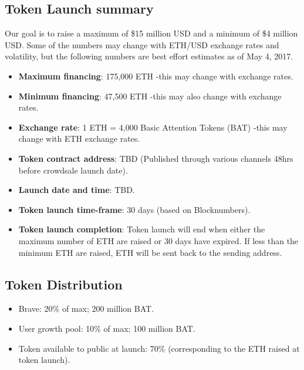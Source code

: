 \documentclass[11pt]{article}
\begin{document}
\subsection{Token Launch summary}
\label{sec-6-1}
{Our goal is to raise a maximum of \$15 million USD and a minimum of \$4 million USD. Some of the numbers may change with ETH/USD exchange rates and volatility, but the following numbers are best effort estimates as of May 4, 2017. }%

\begin{itemize}
\item{\textbf{Maximum financing}: 175,000 ETH -this may change with exchange rates.}
\item{\textbf{Minimum financing}:  47,500 ETH -this may also change with exchange rates.}
\item{\textbf{Exchange rate}: 1 ETH = 4,000 Basic Attention Tokens (\textrm{BAT}) -this may change with ETH exchange rates.}
\item{\textbf{Token contract address}: TBD (Published through various channels 48hrs before crowdsale launch date).}
\item{\textbf{Launch date and time}: TBD.}
\item{\textbf{Token launch time-frame}: 30 days (based on Blocknumbers).}
\item{\textbf{Token launch completion}: Token launch will end when either the maximum number of ETH are raised or 30 days have expired. If less than the minimum ETH are raised, ETH will be sent back to the sending address.}
\end{itemize}
\subsection{Token Distribution}
\label{sec-6-2}

\begin{itemize}
\item{Brave: 20\% of max; 200 million \textrm{BAT}.}
\item{User growth pool: 10\% of max; 100 million \textrm{BAT}.}
\item{Token available to public at launch: 70\% (corresponding to the ETH raised at token launch).}
\end{itemize}
\end{document}
